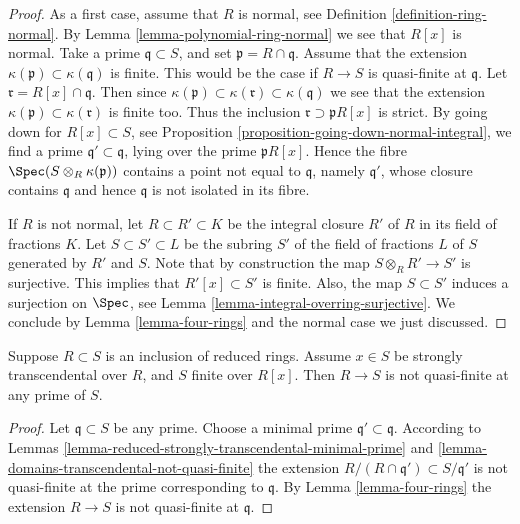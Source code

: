 \begin{proof}
As a first case, assume that $R$ is normal, see
Definition \ref{definition-ring-normal}.
By Lemma \ref{lemma-polynomial-ring-normal}
we see that $R[x]$ is normal.
Take a prime $\mathfrak q \subset S$,
and set $\mathfrak p = R \cap \mathfrak q$.
Assume that the extension $\kappa(\mathfrak p)
\subset \kappa(\mathfrak q)$ is finite.
This would be the case if $R \to S$ is
quasi-finite at $\mathfrak q$.
Let $\mathfrak r = R[x] \cap \mathfrak q$.
Then since $\kappa(\mathfrak p)
\subset \kappa(\mathfrak r) \subset \kappa(\mathfrak q)$
we see that the extension $\kappa(\mathfrak p)
\subset \kappa(\mathfrak r)$ is finite too.
Thus the inclusion $\mathfrak r \supset \mathfrak p R[x]$
is strict. By going down for $R[x] \subset S$,
see Proposition \ref{proposition-going-down-normal-integral},
we find a prime $\mathfrak q' \subset \mathfrak q$,
lying over the prime $\mathfrak pR[x]$. Hence
the fibre $\Spec(S \otimes_R \kappa(\mathfrak p))$
contains a point not equal to $\mathfrak q$,
namely $\mathfrak q'$, whose closure contains $\mathfrak q$ and hence
$\mathfrak q$ is not isolated in its fibre.

\medskip\noindent
If $R$ is not normal, let $R \subset R' \subset K$ be
the integral closure $R'$ of $R$ in its field of fractions
$K$. Let $S \subset S' \subset L$ be the subring $S'$ of
the field of fractions $L$ of $S$ generated by $R'$ and
$S$. Note that by construction the map $S \otimes_R R'
\to S'$ is surjective. This implies that $R'[x] \subset S'$
is finite. Also, the map $S \subset S'$
induces a surjection on $\Spec$, see
Lemma \ref{lemma-integral-overring-surjective}.
We conclude by Lemma \ref{lemma-four-rings} and the normal case
we just discussed.
\end{proof}

\begin{lemma}
\label{lemma-reduced-strongly-transcendental-not-quasi-finite}
Suppose $R \subset S$ is an inclusion of reduced rings.
Assume $x \in S$ be strongly transcendental over $R$,
and $S$ finite over $R[x]$. Then $R \to S$ is not
quasi-finite at any prime of $S$.
\end{lemma}

\begin{proof}
Let $\mathfrak q \subset S$ be any prime.
Choose a minimal prime $\mathfrak q' \subset \mathfrak q$.
According to Lemmas
\ref{lemma-reduced-strongly-transcendental-minimal-prime} and
\ref{lemma-domains-transcendental-not-quasi-finite}
the extension $R/(R \cap \mathfrak q') \subset
S/\mathfrak q'$ is not quasi-finite at the prime corresponding
to $\mathfrak q$. By Lemma \ref{lemma-four-rings}
the extension $R \to S$ is not quasi-finite
at $\mathfrak q$.
\end{proof}

